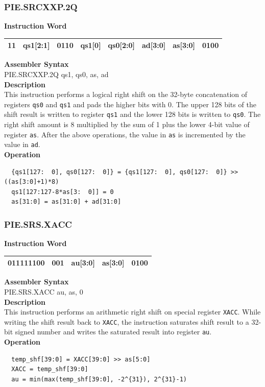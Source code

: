 \newpage
\subsubsection{PIE.SRCXXP.2Q}\label{instruction:PIESRCXXP2Q}
\setlength\tabcolsep{6pt}
\textbf{Instruction Word} \\
\begin{tabular}{|c|c|c|c|c|c|c|c|}
	\hline
	11 & qs1[2:1] & 0110 & qs1[0] & qs0[2:0] & ad[3:0] & as[3:0] & 0100 \\
	\hline
\end{tabular}

\textbf{Assembler Syntax} \\
PIE.SRCXXP.2Q qs1, qs0, as, ad \\
\textbf{Description} \\
This instruction performs a logical right shift on the 32-byte concatenation of registers \lstinline{qs0} and \lstinline{qs1} and pads the higher bits with 0. The upper 128 bits of the shift result is written to register \lstinline{qs1} and the lower 128 bits is written to \lstinline{qs0}. The right shift amount is 8 multiplied by the sum of 1 plus the lower 4-bit value of register \lstinline{as}. After the above operations, the value in \lstinline{as} is incremented by the value in \lstinline{ad}.\\
\textbf{Operation}
\begin{lstlisting}
  {qs1[127:  0], qs0[127:  0]} = {qs1[127:  0], qs0[127:  0]} >> ((as[3:0]+1)*8)
  qs1[127:127-8*as[3:  0]] = 0
  as[31:0] = as[31:0] + ad[31:0]
\end{lstlisting}

\newpage
\subsubsection{PIE.SRS.XACC}\label{instruction:PIESRSXACC}
\setlength\tabcolsep{6pt}
\textbf{Instruction Word} \\
\begin{tabular}{|c|c|c|c|c|}
	\hline
	011111100 & 001 & au[3:0] & as[3:0] & 0100 \\
	\hline
\end{tabular}

\textbf{Assembler Syntax} \\
PIE.SRS.XACC au, as, 0 \\
\textbf{Description} \\
This instruction performs an arithmetic right shift on special register \lstinline{XACC}. While writing the shift result back to \lstinline{XACC}, the instruction saturates shift result to a 32-bit signed number and writes the saturated result into register \lstinline{au}.\\
\textbf{Operation}
\begin{lstlisting}
  temp_shf[39:0] = XACC[39:0] >> as[5:0]
  XACC = temp_shf[39:0]
  au = min(max(temp_shf[39:0], -2^{31}), 2^{31}-1)
\end{lstlisting}

